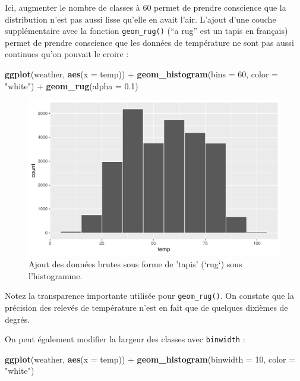 \documentclass[a4paperpaper,]{article}
\newenvironment{Shaded}{\begin{snugshade}}{\end{snugshade}}
\newcommand{\DataTypeTok}[1]{\textcolor[rgb]{0.00,0.34,0.68}{#1}}
\newcommand{\DecValTok}[1]{\textcolor[rgb]{0.69,0.50,0.00}{#1}}
\newcommand{\FloatTok}[1]{\textcolor[rgb]{0.69,0.50,0.00}{#1}}
\newcommand{\KeywordTok}[1]{\textcolor[rgb]{0.12,0.11,0.11}{\textbf{#1}}}
\newcommand{\NormalTok}[1]{\textcolor[rgb]{0.12,0.11,0.11}{#1}}
\newcommand{\OperatorTok}[1]{\textcolor[rgb]{0.12,0.11,0.11}{#1}}
\newcommand{\StringTok}[1]{\textcolor[rgb]{0.75,0.01,0.01}{#1}}
\theoremstyle{definition}
\theoremstyle{definition}
\theoremstyle{definition}
\theoremstyle{remark}
\begin{document}
Ici, augmenter le nombre de classes à 60 permet de prendre conscience
que la distribution n'est pas aussi lisse qu'elle en avait l'air.
L'ajout d'une couche supplémentaire avec la fonction
\texttt{geom\_rug()} (``a rug'' est un tapis en français) permet de
prendre conscience que les données de température ne sont pas aussi
continues qu'on pouvait le croire :

\begin{Shaded}
\begin{Highlighting}[]
\KeywordTok{ggplot}\NormalTok{(weather, }\KeywordTok{aes}\NormalTok{(}\DataTypeTok{x =}\NormalTok{ temp)) }\OperatorTok{+}
\StringTok{  }\KeywordTok{geom_histogram}\NormalTok{(}\DataTypeTok{bins =} \DecValTok{60}\NormalTok{, }\DataTypeTok{color =} \StringTok{"white"}\NormalTok{) }\OperatorTok{+}
\StringTok{  }\KeywordTok{geom_rug}\NormalTok{(}\DataTypeTok{alpha =} \FloatTok{0.1}\NormalTok{)}
\end{Highlighting}
\end{Shaded}

\begin{figure}[htpb]

{\centering \includegraphics[width=0.9\linewidth]{figure/unnamed-chunk-50-1} 

}

\caption{Ajout des données brutes sous forme de 'tapis' (`rug`) sous l'histogramme.}\label{fig:unnamed-chunk-50}
\end{figure}

Notez la transparence importante utilisée pour \texttt{geom\_rug()}. On
constate que la précision des relevés de température n'est en fait que
de quelques dixièmes de degrés.

On peut également modifier la largeur des classes avec \texttt{binwidth}
:

\begin{Shaded}
\begin{Highlighting}[]
\KeywordTok{ggplot}\NormalTok{(weather, }\KeywordTok{aes}\NormalTok{(}\DataTypeTok{x =}\NormalTok{ temp)) }\OperatorTok{+}
\StringTok{  }\KeywordTok{geom_histogram}\NormalTok{(}\DataTypeTok{binwidth =} \DecValTok{10}\NormalTok{, }\DataTypeTok{color =} \StringTok{"white"}\NormalTok{)}
\end{Highlighting}
\end{Shaded}
\end{document}
